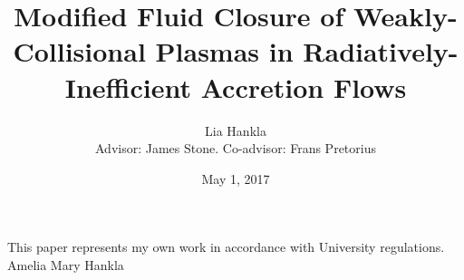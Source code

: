 \documentclass[11pt,notitlepage]{report}
\title{Modified Fluid Closure of Weakly-Collisional Plasmas in Radiatively-Inefficient Accretion Flows}
\author{Lia Hankla\\Advisor: James Stone. Co-advisor: Frans Pretorius}
\date{May 1, 2017}
\begin{document}
\maketitle


\tableofcontents

\vspace{2in}
\begin{center}
  This paper represents my own work in accordance with University regulations.\\
Amelia Mary Hankla
\end{center}




 

 




%

\clearpage


\end{document}
